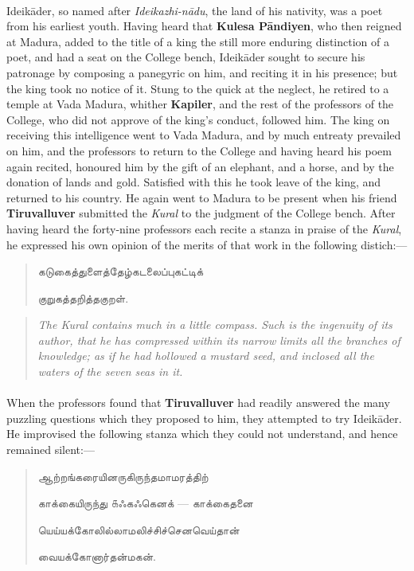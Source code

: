 \documentclass{article}
\newcommand{\TamilText}[1]{\texttamil{#1}}
\newcommand{\tam}[1]{\TamilText{#1}}
\begin{document}
\paragraph{}
Ideik\={a}der, so named after \emph{Ideikazhi-n\={a}du}, the land of his nativity, was a poet from his earliest youth. Having heard that \textbf{Kulesa P\={a}ndiyen}, who then reigned at Madura, added to the title of a king the still more enduring distinction of a poet, and had a seat on the College bench, Ideik\={a}der sought to secure his patronage by composing a panegyric on him, and reciting it in his presence; but the king took no notice of it. Stung to the quick at the neglect, he retired to a temple at Vada Madura, whither \textbf{Kapiler}, and the rest of the professors of the College, who did not approve of the king's conduct, followed him. The king on receiving this intelligence went to Vada Madura, and by much entreaty prevailed on him, and the professors to return to the College and having heard his poem again recited, honoured him by the gift of an elephant, and a horse, and by the donation of lands and gold. Satisfied with this he took leave of the king, and returned to his country. He again went to Madura to be present when his friend \textbf{Tiruvalluver} submitted the \emph{Kural} to the judgment of the College bench. After having heard the forty-nine professors each recite a stanza in praise of the \emph{Kural}, he expressed his own opinion of the merits of that work in the following distich:---
\begin{quotation}\small
\tam{கடுகைத்துளைத்தேழ்கடலைப்புகட்டிக்}

\tam{குறுகத்தறித்தகுறள்}.
\end{quotation}
\begin{quotation}\small
\emph{The Kural contains much in a little compass. Such is the ingenuity of its author, that he has compressed within its narrow limits all the branches of knowledge; as if he had hollowed a mustard seed, and inclosed all the waters of the seven seas in it.}
\end{quotation}
\paragraph{}
When the professors found that \textbf{Tiruvalluver} had readily answered the many puzzling questions which they proposed to him, they attempted to try Ideik\={a}der. He improvised the following stanza which they could not understand, and hence remained silent:---
\begin{quotation}\small
\tam{ஆற்றங்கரையினருகிருந்தமாமரத்திற்}

\tam{காக்கையிருந்து ௧ஃகஃகெனக்} --- \tam{காக்கைதனை}

\tam{யெய்யக்கோலில்லாமலிச்சிச்செனவெய்தான்‌}

\tam{வையக்கோனார்தன்மகன்‌}.
\end{quotation}
\end{document}
